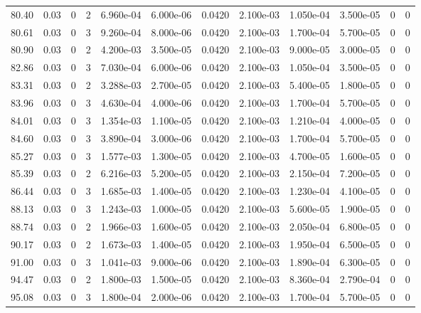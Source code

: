 \documentclass[preview]{standalone}
\begin{document}
{{{{\begin{tabular}{L{1.2cm}C{1.2cm} C{0.3cm}C{0.5cm} C{1.4cm}C{1.4cm} C{1.4cm}C{1.4cm} C{1.6cm}C{1.6cm} C{1.6cm}C{1.6cm}}
  80.40  &  0.03  & 0     &  2 &  6.960e-04  & 6.000e-06  &  0.0420&   2.100e-03& 1.050e-04 & 3.500e-05   &  0 & 0  \\ 
  80.61  &  0.03  & 0     &  3 &  9.260e-04  & 8.000e-06  &  0.0420&   2.100e-03& 1.700e-04 & 5.700e-05   &  0 & 0  \\ 
  80.90  &  0.03  & 0     &  2 &  4.200e-03  & 3.500e-05  &  0.0420&   2.100e-03& 9.000e-05 & 3.000e-05   &  0 & 0  \\ 
  82.86  &  0.03  & 0     &  3 &  7.030e-04  & 6.000e-06  &  0.0420&   2.100e-03& 1.050e-04 & 3.500e-05   &  0 & 0  \\ 
  83.31  &  0.03  & 0     &  2 &  3.288e-03  & 2.700e-05  &  0.0420&   2.100e-03& 5.400e-05 & 1.800e-05   &  0 & 0  \\ 
  83.96  &  0.03  & 0     &  3 &  4.630e-04  & 4.000e-06  &  0.0420&   2.100e-03& 1.700e-04 & 5.700e-05   &  0 & 0  \\ 
  84.01  &  0.03  & 0     &  3 &  1.354e-03  & 1.100e-05  &  0.0420&   2.100e-03& 1.210e-04 & 4.000e-05   &  0 & 0  \\ 
  84.60  &  0.03  & 0     &  3 &  3.890e-04  & 3.000e-06  &  0.0420&   2.100e-03& 1.700e-04 & 5.700e-05   &  0 & 0  \\ 
  85.27  &  0.03  & 0     &  3 &  1.577e-03  & 1.300e-05  &  0.0420&   2.100e-03& 4.700e-05 & 1.600e-05   &  0 & 0  \\ 
  85.39  &  0.03  & 0     &  2 &  6.216e-03  & 5.200e-05  &  0.0420&   2.100e-03& 2.150e-04 & 7.200e-05   &  0 & 0  \\ 
  86.44  &  0.03  & 0     &  3 &  1.685e-03  & 1.400e-05  &  0.0420&   2.100e-03& 1.230e-04 & 4.100e-05   &  0 & 0  \\ 
  88.13  &  0.03  & 0     &  3 &  1.243e-03  & 1.000e-05  &  0.0420&   2.100e-03& 5.600e-05 & 1.900e-05   &  0 & 0  \\ 
  88.74  &  0.03  & 0     &  2 &  1.966e-03  & 1.600e-05  &  0.0420&   2.100e-03& 2.050e-04 & 6.800e-05   &  0 & 0  \\ 
  90.17  &  0.03  & 0     &  2 &  1.673e-03  & 1.400e-05  &  0.0420&   2.100e-03& 1.950e-04 & 6.500e-05   &  0 & 0  \\ 
  91.00  &  0.03  & 0     &  3 &  1.041e-03  & 9.000e-06  &  0.0420&   2.100e-03& 1.890e-04 & 6.300e-05   &  0 & 0  \\ 
  94.47  &  0.03  & 0     &  2 &  1.800e-03  & 1.500e-05  &  0.0420&   2.100e-03& 8.360e-04 & 2.790e-04   &  0 & 0  \\ 
  95.08  &  0.03  & 0     &  3 &  1.800e-04  & 2.000e-06  &  0.0420&   2.100e-03& 1.700e-04 & 5.700e-05   &  0 & 0  \\ 

\end{tabular}}}}}
\end{document}
